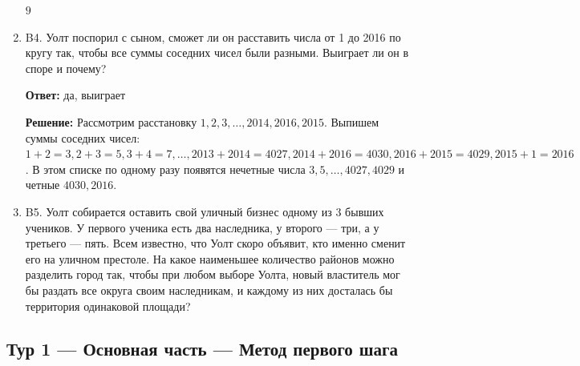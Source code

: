 \documentclass[12pt]{article}
\newenvironment{problem}{}{}
\newenvironment{sol}{}{} %
\begin{document}
\begin{enumerate}
\begin{problem}
\begin{sol}
$9$
\end{sol}
\end{problem}

\begin{problem}
\item[B4.] Уолт поспорил с сыном, сможет ли он расставить числа от 1 до 2016 по кругу так, чтобы все суммы соседних чисел были разными. Выиграет ли он в споре и почему?

\begin{sol}
\textbf{Ответ:} да, выиграет

\textbf{Решение:} Рассмотрим расстановку $1, 2, 3,\hdots, 2014, 2016, 2015$. Выпишем суммы соседних чисел: $1+2 = 3, 2+3 = 5, 3+4 = 7,\hdots, 2013+2014 = 4027, 2014+
2016 = 4030, 2016 + 2015 = 4029, 2015 + 1 = 2016$. В этом списке по одному
разу появятся нечетные числа $3, 5,\hdots, 4027, 4029$ и четные $4030, 2016$.
\end{sol}
\end{problem}

\begin{problem}
\item[B5.] Уолт собирается оставить свой уличный бизнес одному из 3 бывших учеников. У первого ученика есть два наследника, у второго — три, а у третьего — пять. Всем известно, что Уолт скоро объявит, кто именно сменит его на уличном престоле. На какое наименьшее количество районов можно разделить город так, чтобы при любом выборе Уолта, новый властитель мог бы раздать все округа своим наследникам, и каждому из них досталась бы территория одинаковой площади?

\begin{sol}
8
\end{sol}
\end{problem}
\end{enumerate}



\newpage
\subsection{Тур 1 — Основная часть — Метод первого шага}
\end{document}
